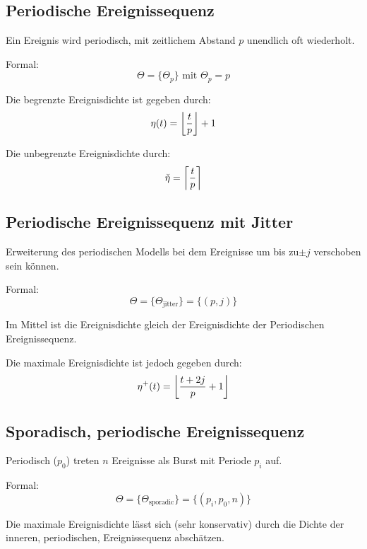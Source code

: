 \subsection{Periodische Ereignissequenz}
Ein Ereignis wird periodisch, mit zeitlichem Abstand $p$ unendlich oft wiederholt.

Formal:
\begin{equation}
    \Theta = \{\Theta_p\} \text{ mit } \Theta_p = p
\end{equation}

Die begrenzte Ereignisdichte ist gegeben durch:
\begin{equation}
    \eta(t) = \floor*{\frac{t}{p}} + 1
\end{equation}

Die unbegrenzte Ereignisdichte durch:
\begin{equation}
    \check{\eta} = \ceil*{\frac{t}{p}}
\end{equation}

\subsection{Periodische Ereignissequenz mit Jitter}
Erweiterung des periodischen Modells bei dem Ereignisse um bis zu$\pm j$ verschoben sein
können.

Formal:
\begin{equation}
    \Theta = \{\Theta_\text{jitter}\} = \{(p, j)\}
\end{equation}

Im Mittel ist die Ereignisdichte gleich der Ereignisdichte der Periodischen 
Ereignissequenz.

Die maximale Ereignisdichte ist jedoch gegeben durch:
\begin{equation}
    \eta^+(t) = \floor*{\frac{t+2 j}{p} + 1}
\end{equation}

\subsection{Sporadisch, periodische Ereignissequenz}
Periodisch ($p_0$) treten $n$ Ereignisse als Burst mit Periode $p_i$ auf.

Formal:
\begin{equation}
    \Theta = \{\Theta_\text{sporadic}\} = \{(p_i, p_0, n)\}
\end{equation}

Die maximale Ereignisdichte lässt sich (sehr konservativ) durch die
Dichte der inneren, periodischen, Ereignissequenz abschätzen.

